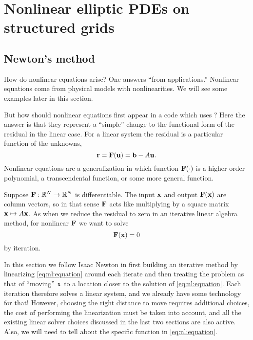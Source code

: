 \renewcommand{\CODELOC}{c/ch4/}

\chapter{Nonlinear elliptic PDEs on structured grids}
\label{chap:nonlinear}

\section{Newton's method}

How do nonlinear equations arise?  One answers ``from applications.''  Nonlinear equations come from physical models with nonlinearities.  We will see some examples later in this section.

But how should nonlinear equations first appear in a code which uses \PETSc?  Here the answer is that they represent a ``simple'' change to the functional form of the residual in the linear case.  For a linear system the residual is a particular function of the unknowns,
\begin{equation}
\mathbf{r} = \mathbf{F}(\mathbf{u}) = \mathbf{b} - A \mathbf{u}. \label{eq:nl:linres}
\end{equation}
Nonlinear equations are a generalization in which function $\mathbf{F}(\cdot)$ is a higher-order polynomial, a transcendental function, or some more general function.

Suppose $\mathbf{F} : \mathbb{R}^N \to \mathbb{R}^N$ is differentiable.  The input $\mathbf{x}$ and output $\mathbf{F}(\mathbf{x})$ are column vectors, so in that sense $\mathbf{F}$ acts like multiplying by a square matrix $\mathbf{x}\mapsto A\mathbf{x}$.  As when we reduce the residual to zero in an iterative linear algebra method, for nonlinear $\mathbf{F}$ we want to solve
\begin{equation}
   \mathbf{F}(\mathbf{x}) = 0   \label{eq:nl:equation}
\end{equation}
by iteration.

In this section we follow Isaac Newton in first building an iterative method by linearizing \eqref{eq:nl:equation} around each iterate and then treating the problem as that of ``moving'' $\mathbf{x}$ to a location closer to the solution of \eqref{eq:nl:equation}.  Each iteration therefore solves a linear system, and we already have some technology for that!  However, choosing the right distance to move requires additional choices, the cost of performing the linearization must be taken into account, and all the existing linear solver choices discussed in the last two sections are also active.  Also, we will need to tell \PETSc about the specific function in \eqref{eq:nl:equation}.

